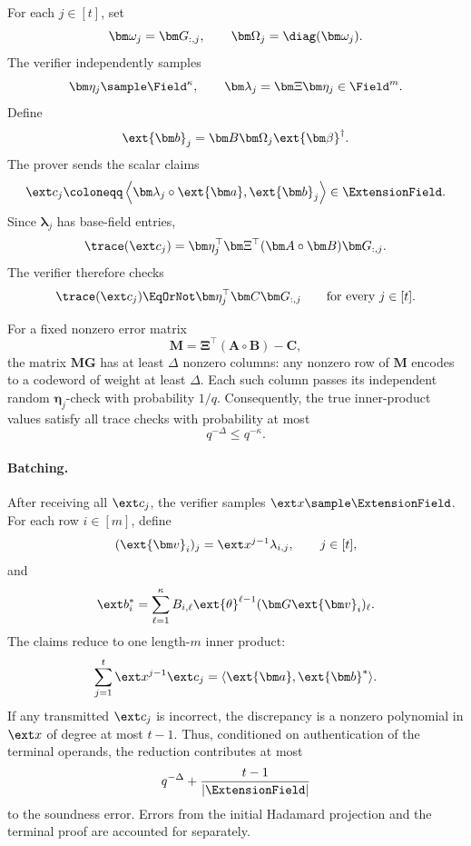 For each \(j\in[t]\), set
\[
    \bm\omega_j=\bm G_{:,j},
    \qquad
    \bm\Omega_j=\diag(\bm\omega_j).
\]
The verifier independently samples
\[
    \bm\eta_j\sample\Field^\kappa,
    \qquad
    \bm\lambda_j=\bm\Xi\bm\eta_j\in\Field^m.
\]
Define
\[
    \ext{\bm b}_j
    =\bm B\bm\Omega_j\ext{\bm\beta}^\dagger.
\]
The prover sends the scalar claims
\[
    \ext c_j
    \coloneqq
    \left\langle
        \bm\lambda_j\circ\ext{\bm a},
        \ext{\bm b}_j
    \right\rangle
    \in\ExtensionField.
\]
Since \(\bm\lambda_j\) has base-field entries,
\[
    \trace(\ext c_j)
    =
    \bm\eta_j^\top
    \bm\Xi^\top(\bm A\circ\bm B)\bm G_{:,j}.
\]
The verifier therefore checks
\[
    \trace(\ext c_j)
    \EqOrNot
    \bm\eta_j^\top\bm C\bm G_{:,j}
    \qquad\text{for every }j\in[t].
\]

For a fixed nonzero error matrix
\[
    \bm M
    =\bm\Xi^\top(\bm A\circ\bm B)-\bm C,
\]
the matrix \(\bm M\bm G\) has at least \(\Delta\) nonzero
columns: any nonzero row of \(\bm M\) encodes to a codeword
of weight at least \(\Delta\).
Each such column passes its independent random
\(\bm\eta_j\)-check with probability \(1/q\).
Consequently, the true inner-product values satisfy all
trace checks with probability at most
\[
    q^{-\Delta}\leq q^{-\kappa}.
\]

\paragraph{Batching.}
After receiving all \(\ext c_j\), the verifier samples
\(\ext x\sample\ExtensionField\).
For each row \(i\in[m]\), define
\[
    (\ext{\bm v}_i)_j
    =\ext x^{j-1}\lambda_{i,j},
    \qquad j\in[t],
\]
and
\[
    \ext b_i^*
    =
    \sum_{\ell=1}^{\kappa}
        B_{i,\ell}\ext{\theta}^{\ell-1}
        (\bm G\ext{\bm v}_i)_\ell.
\]
The claims reduce to one length-\(m\) inner product:
\[
    \sum_{j=1}^{t}\ext x^{j-1}\ext c_j
    =
    \langle\ext{\bm a},\ext{\bm b}^*\rangle.
\]
If any transmitted \(\ext c_j\) is incorrect, the
discrepancy is a nonzero polynomial in \(\ext x\) of
degree at most \(t-1\).
Thus, conditioned on authentication of the terminal
operands, the reduction contributes at most
\[
    q^{-\Delta}
    +\frac{t-1}{|\ExtensionField|}
\]
to the soundness error.
Errors from the initial Hadamard projection and the
terminal proof are accounted for separately.

